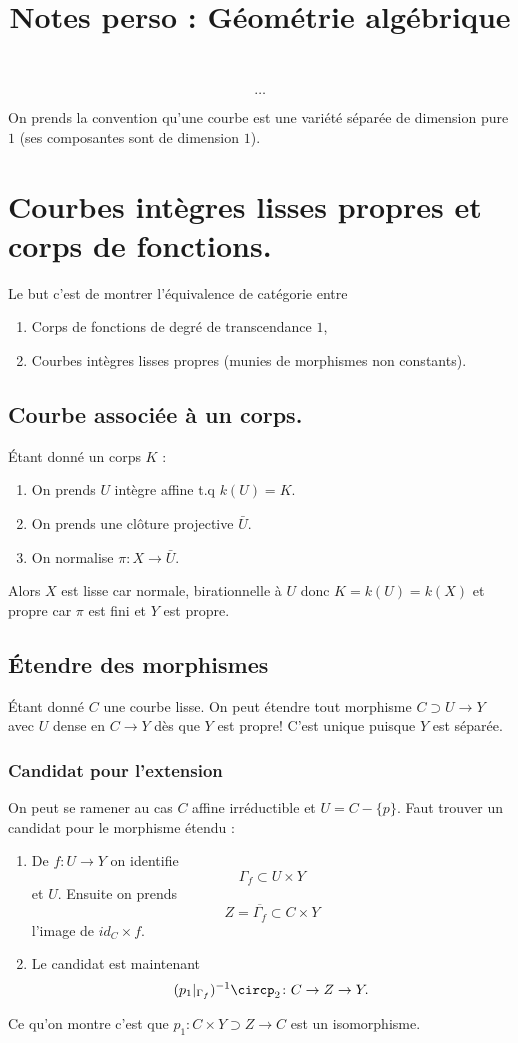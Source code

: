 \documentclass[a4paper,12pt]{book}
\title{Notes perso : Géométrie algébrique}
\date{}
\theoremstyle{plain}
\theoremstyle{definition}
\theoremstyle{remark}
\begin{document}
\maketitle
\tableofcontents
\[\ldots\]   

On prends la convention qu'une courbe est une variété
séparée de dimension pure $1$ (ses composantes sont de dimension
$1$).
\chapter{Courbes intègres lisses propres et corps de fonctions.}
Le but c'est de montrer l'équivalence de catégorie entre 
\begin{enumerate}
  \item Corps de fonctions de degré de transcendance $1$,
  \item Courbes intègres lisses propres (munies de morphismes non constants).
\end{enumerate}
\section{Courbe associée à un corps.}
Étant donné un corps $K$ :
\begin{enumerate}
  \item On prends $U$ intègre affine t.q $k(U)=K$.
  \item On prends une clôture projective $\bar U$.
  \item On normalise $\pi\colon X\to \bar U$.
\end{enumerate}
Alors $X$ est lisse car normale, birationnelle à
$U$ donc $K=k(U)=k(X)$ et propre car $\pi$ est fini
et $Y$ est propre.

\section{Étendre des morphismes}
Étant donné $C$ une courbe lisse. On peut étendre
tout morphisme $C\supset U \to Y$ avec $U$ dense 
en $C\to Y$ dès que $Y$ est propre!
C'est unique puisque $Y$ est séparée.
\subsection{Candidat pour l'extension}
On peut se ramener au cas $C$ affine irréductible 
et $U=C-\{p\}$. Faut trouver un candidat pour
le morphisme étendu :
\begin{enumerate}
  \item De $f\colon U\to Y$ on identifie 
    \[\Gamma_f\subset U\times Y\]
    et $U$. Ensuite on prends
    \[Z=\overline{\Gamma_f}\subset C\times Y\]
    l'image de $id_C\times f$.
  \item Le candidat est maintenant
    \[(p_1|_{\Gamma_f})^{-1}\circp_2 \colon C\to Z \to Y.\]
\end{enumerate} 
Ce qu'on montre c'est que $p_1\colon C\times Y \supset Z\to C$
est un isomorphisme. 
\end{document}
